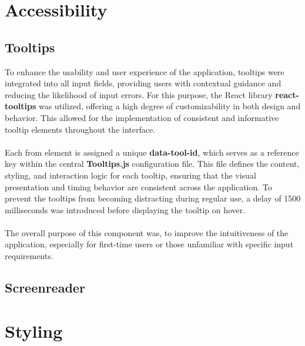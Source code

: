 \documentclass[a4paper,12pt]{report}
\begin{document}
\section{Accessibility}
\subsection{Tooltips}
To enhance the usability and user experience of the application, tooltips were integrated into all input fields, providing users with contextual guidance and reducing the likelihood of input errors. For this purpose, the React library \textbf{react-tooltips} was utilized, offering a high degree of customizability in both design and behavior. This allowed for the implementation of consistent and informative tooltip elements throughout the interface.\parencite{tooltips} \\ \\
Each from element is assigned a unique \textbf{data-tool-id}, which serves as a reference key within the central \textbf{Tooltips.js} configuration file. This file defines the content, styling, and interaction logic for each tooltip, ensuring that the visual presentation and timing behavior are consistent across the application. To prevent the tooltips from becoming distracting during regular use, a delay of 1500 milliseconds was introduced before displaying the tooltip on hover.\\ \\
The overall purpose of this component was, to improve the intuitiveness of the application, especially for first-time users or those unfamiliar with specific input requirements.
\subsection{Screenreader}
\section{Styling}
\end{document}

